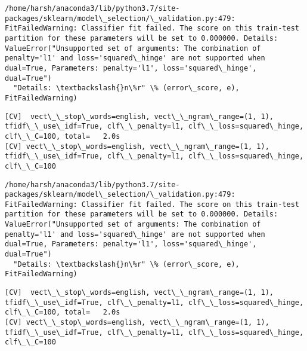 \documentclass[11pt]{article}
\begin{document}
    \begin{Verbatim}[commandchars=\\\{\}]
/home/harsh/anaconda3/lib/python3.7/site-packages/sklearn/model\_selection/\_validation.py:479: FitFailedWarning: Classifier fit failed. The score on this train-test partition for these parameters will be set to 0.000000. Details: 
ValueError("Unsupported set of arguments: The combination of penalty='l1' and loss='squared\_hinge' are not supported when dual=True, Parameters: penalty='l1', loss='squared\_hinge', dual=True")
  "Details: \textbackslash{}n\%r" \% (error\_score, e), FitFailedWarning)

    \end{Verbatim}

    \begin{Verbatim}[commandchars=\\\{\}]
[CV]  vect\_\_stop\_words=english, vect\_\_ngram\_range=(1, 1), tfidf\_\_use\_idf=True, clf\_\_penalty=l1, clf\_\_loss=squared\_hinge, clf\_\_C=100, total=   2.0s
[CV] vect\_\_stop\_words=english, vect\_\_ngram\_range=(1, 1), tfidf\_\_use\_idf=True, clf\_\_penalty=l1, clf\_\_loss=squared\_hinge, clf\_\_C=100 

    \end{Verbatim}

    \begin{Verbatim}[commandchars=\\\{\}]
/home/harsh/anaconda3/lib/python3.7/site-packages/sklearn/model\_selection/\_validation.py:479: FitFailedWarning: Classifier fit failed. The score on this train-test partition for these parameters will be set to 0.000000. Details: 
ValueError("Unsupported set of arguments: The combination of penalty='l1' and loss='squared\_hinge' are not supported when dual=True, Parameters: penalty='l1', loss='squared\_hinge', dual=True")
  "Details: \textbackslash{}n\%r" \% (error\_score, e), FitFailedWarning)

    \end{Verbatim}

    \begin{Verbatim}[commandchars=\\\{\}]
[CV]  vect\_\_stop\_words=english, vect\_\_ngram\_range=(1, 1), tfidf\_\_use\_idf=True, clf\_\_penalty=l1, clf\_\_loss=squared\_hinge, clf\_\_C=100, total=   2.0s
[CV] vect\_\_stop\_words=english, vect\_\_ngram\_range=(1, 1), tfidf\_\_use\_idf=True, clf\_\_penalty=l1, clf\_\_loss=squared\_hinge, clf\_\_C=100 

    \end{Verbatim}
\end{document}
